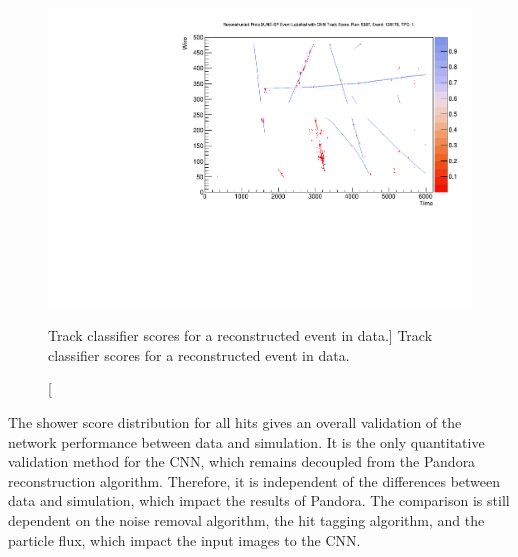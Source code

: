 \begin{figure}
	\centering
	\includegraphics[width=\textwidth]{figures/run5387_tpc1_view2_128178.pdf}
	\caption
	[Track classifier scores for a reconstructed event in \protodune{} data.]
	{Track classifier scores for a reconstructed event in \protodune{} data.}
	\label{fig:real_event}
\end{figure}

The shower score distribution for all hits gives an overall validation of the 
network performance between data and simulation. It is the only quantitative 
validation method for the CNN, which remains decoupled from the Pandora 
reconstruction algorithm. Therefore, it is independent of the differences 
between data and simulation, which impact the results of Pandora.  The 
comparison is still dependent on the noise removal algorithm, the hit tagging 
algorithm, and the particle flux, which impact the input images to the CNN.

